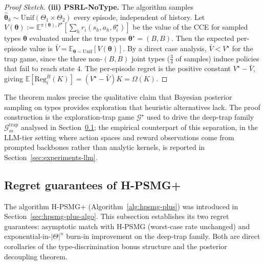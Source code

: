 \documentclass{article}
\def\textsuperscript#1{#1}%
\begin{document}
\begin{proof}[Proof Sketch]
\textbf{(iii) PSRL-NoType.} The algorithm samples $\hat{\boldsymbol{\theta}}_k \sim \mathrm{Unif}(\Theta_1 \times \Theta_2)$ every episode, independent of history. Let $V(\boldsymbol{\theta}) := \mathbb{E}^{\pi(\boldsymbol{\theta}), P^\star}[\sum_h r_i(s_h, a_h, \theta_i^\star)]$ be the value of the CCE for sampled types $\boldsymbol{\theta}$ evaluated under the true types $\boldsymbol{\theta}^\star = (B, B)$. Then the expected per-episode value is $\bar V = \mathbb{E}_{\boldsymbol{\theta} \sim \mathrm{Unif}}[V(\boldsymbol{\theta})]$. By a direct case analysis, $\bar V < V^\star$ for the trap game, since the three non-$(B,B)$ joint types ($\frac{3}{4}$ of samples) induce policies that fail to reach state $4$. The per-episode regret is the positive constant $V^\star - \bar V$, giving $\mathbb{E}[\mathrm{Reg}_i^B(K)] = (V^\star - \bar V) K = \Omega(K)$.
\end{proof}

The theorem makes precise the qualitative claim that Bayesian posterior sampling on types provides exploration that heuristic alternatives lack. The proof construction is the exploration-trap game $\mathcal{G}^\star$ used to drive the deep-trap family $\mathcal{G}_m^{\mathrm{trap}}$ analysed in Section~\ref{sec:hpsmg-plus}; the empirical counterpart of this separation, in the LLM-tier setting where action spaces and reward observations come from prompted backbones rather than analytic kernels, is reported in Section~\ref{sec:experiments-llm}.

\subsection{Regret guarantees of H-PSMG\textsuperscript{+}}
\label{sec:hpsmg-plus}

The algorithm H-PSMG\textsuperscript{+} (Algorithm~\ref{alg:hpsmg-plus}) was introduced in Section~\ref{sec:hpsmg-plus-algo}. This subsection establishes its two regret guarantees: asymptotic match with H-PSMG (worst-case rate unchanged) and exponential-in-$|\Theta|^n$ burn-in improvement on the deep-trap family. Both are direct corollaries of the type-discrimination bonus structure and the posterior decoupling theorem.
\end{document}
